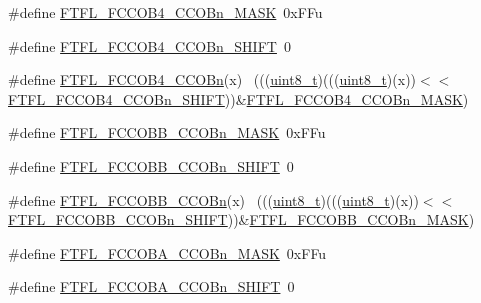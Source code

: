 \begin{DoxyCompactItemize}
\item 
\#define \hyperlink{group___f_t_f_l___register___masks_gacf14a3998b383208d9afab60b561667e}{F\+T\+F\+L\+\_\+\+F\+C\+C\+O\+B4\+\_\+\+C\+C\+O\+Bn\+\_\+\+M\+A\+SK}~0x\+F\+Fu
\item 
\#define \hyperlink{group___f_t_f_l___register___masks_ga0d53c20a9a46795ddfe5bd46653d101d}{F\+T\+F\+L\+\_\+\+F\+C\+C\+O\+B4\+\_\+\+C\+C\+O\+Bn\+\_\+\+S\+H\+I\+FT}~0
\item 
\#define \hyperlink{group___f_t_f_l___register___masks_ga553af55bc5cc70f4081aad049bf2872c}{F\+T\+F\+L\+\_\+\+F\+C\+C\+O\+B4\+\_\+\+C\+C\+O\+Bn}(x)                                      ~(((\hyperlink{_p_e___types_8h_aba7bc1797add20fe3efdf37ced1182c5}{uint8\+\_\+t})(((\hyperlink{_p_e___types_8h_aba7bc1797add20fe3efdf37ced1182c5}{uint8\+\_\+t})(x))$<$$<$\hyperlink{group___f_t_f_l___register___masks_ga0d53c20a9a46795ddfe5bd46653d101d}{F\+T\+F\+L\+\_\+\+F\+C\+C\+O\+B4\+\_\+\+C\+C\+O\+Bn\+\_\+\+S\+H\+I\+FT}))\&\hyperlink{group___f_t_f_l___register___masks_gacf14a3998b383208d9afab60b561667e}{F\+T\+F\+L\+\_\+\+F\+C\+C\+O\+B4\+\_\+\+C\+C\+O\+Bn\+\_\+\+M\+A\+SK})
\item 
\#define \hyperlink{group___f_t_f_l___register___masks_ga00aef335772d6ebee4d1e0fbeda40c7d}{F\+T\+F\+L\+\_\+\+F\+C\+C\+O\+B\+B\+\_\+\+C\+C\+O\+Bn\+\_\+\+M\+A\+SK}~0x\+F\+Fu
\item 
\#define \hyperlink{group___f_t_f_l___register___masks_ga067fddda40a93b82c28ccc4ce3a953bd}{F\+T\+F\+L\+\_\+\+F\+C\+C\+O\+B\+B\+\_\+\+C\+C\+O\+Bn\+\_\+\+S\+H\+I\+FT}~0
\item 
\#define \hyperlink{group___f_t_f_l___register___masks_ga8c8c060a2b2c08932c0e1b086c0c7d60}{F\+T\+F\+L\+\_\+\+F\+C\+C\+O\+B\+B\+\_\+\+C\+C\+O\+Bn}(x)                                      ~(((\hyperlink{_p_e___types_8h_aba7bc1797add20fe3efdf37ced1182c5}{uint8\+\_\+t})(((\hyperlink{_p_e___types_8h_aba7bc1797add20fe3efdf37ced1182c5}{uint8\+\_\+t})(x))$<$$<$\hyperlink{group___f_t_f_l___register___masks_ga067fddda40a93b82c28ccc4ce3a953bd}{F\+T\+F\+L\+\_\+\+F\+C\+C\+O\+B\+B\+\_\+\+C\+C\+O\+Bn\+\_\+\+S\+H\+I\+FT}))\&\hyperlink{group___f_t_f_l___register___masks_ga00aef335772d6ebee4d1e0fbeda40c7d}{F\+T\+F\+L\+\_\+\+F\+C\+C\+O\+B\+B\+\_\+\+C\+C\+O\+Bn\+\_\+\+M\+A\+SK})
\item 
\#define \hyperlink{group___f_t_f_l___register___masks_ga990729a695abb380c9cc804f68ec67b5}{F\+T\+F\+L\+\_\+\+F\+C\+C\+O\+B\+A\+\_\+\+C\+C\+O\+Bn\+\_\+\+M\+A\+SK}~0x\+F\+Fu
\item 
\#define \hyperlink{group___f_t_f_l___register___masks_gaa02cc5a818b780fca7bbfd8755ff6edd}{F\+T\+F\+L\+\_\+\+F\+C\+C\+O\+B\+A\+\_\+\+C\+C\+O\+Bn\+\_\+\+S\+H\+I\+FT}~0

\end{DoxyCompactItemize}
